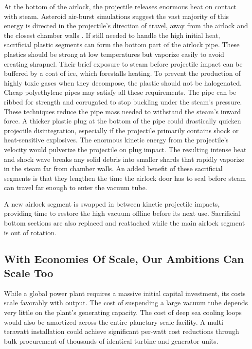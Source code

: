 \documentclass{article}
\begin{document}
At the bottom of the airlock, the projectile releases enormous heat on contact with steam. Asteroid air-burst simulations suggest the vast majority of this energy is directed in the projectile's direction of travel, away from the airlock and the closest chamber walls \cite{tunguska_downwards}. If still needed to handle the high initial heat, sacrificial plastic segments can form the bottom part of the airlock pipe. These plastics should be strong at low temperatures but vaporize easily to avoid creating shrapnel. Their brief exposure to steam before projectile impact can be buffered by a coat of ice, which forestalls heating. To prevent the production of highly toxic gases when they decompose, the plastic should not be halogenated. Cheap polyethylene pipes may satisfy all these requirements.  The pipe can be ribbed for strength and corrugated to stop buckling under the steam's pressure.  These techniques reduce the pipe mass needed to withstand the steam's inward force.  A thicker plastic plug at the bottom of the pipe could drastically quicken projectile disintegration, especially if the projectile primarily contains shock or heat-sensitive explosives. The enormous kinetic energy from the projectile's velocity would pulverize the projectile on plug impact. The resulting intense heat and shock wave breaks any solid debris into smaller shards that rapidly vaporize in the steam far from chamber walls.  An added benefit of these sacrificial segments is that they lengthen the time the airlock door has to seal before steam can travel far enough to enter the vacuum tube.

A new airlock segment is swapped in between kinetic projectile impacts, providing time to restore the high vacuum offline before its next use. Sacrificial bottom sections are also replaced and reattached while the main airlock segment is out of rotation.

\subsection{With Economies Of Scale, Our Ambitions Can Scale Too}\label{sec:strawway_economics}

While a global power plant requires a massive initial capital investment, its costs scale favorably with output. The cost of suspending a large vacuum tube depends very little on the plant's generating capacity. The cost of deep sea cooling loops would also be amortized across the entire planetary scale facility.  A multi-terawatt installation could achieve significant per-watt cost reductions through bulk procurement of thousands of identical turbine and generator units. 
\end{document}
